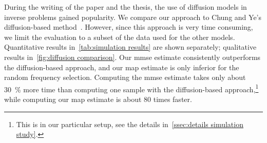 During the writing of the paper and the thesis, the use of diffusion models in inverse problems gained popularity.
We compare our approach to Chung and Ye's diffusion-based method~\cite{chung_scoremri_2022}.
However, since this approach is very time consuming, we limit the evaluation to a subset of the data used for the other models.
Quantitative results in~\cref{tab:simulation results} are shown separately; qualitative results in~\cref{fig:diffusion comparison}.
Our \gls{mmse} estimate consistently outperforms the diffusion-based approach, and our \gls{map} estimate is only inferior for the random frequency selection.
Computing the \gls{mmse} estimate takes only about \qty{30}{\percent} more time than computing one sample with the diffusion-based approach,\footnote{%
	This is in our particular setup, see the details in~\cref{ssec:details simulation study}.
}
while computing our \gls{map} estimate is about \num{80} times faster.
